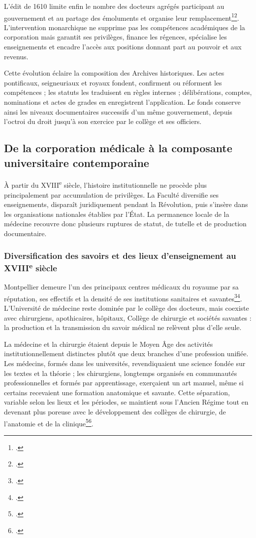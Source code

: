 L'édit de 1610 limite enfin le nombre des docteurs agrégés participant au gouvernement et au partage des émoluments et organise leur remplacement\footcite[fol.~160v--164v]{AHFMS1}\footcite[p. 126--141]{Astruc1767}. L'intervention monarchique ne supprime pas les compétences académiques de la corporation mais garantit ses privilèges, finance les régences, spécialise les enseignements et encadre l'accès aux positions donnant part au pouvoir et aux revenus.

Cette évolution éclaire la composition des Archives historiques. Les actes pontificaux, seigneuriaux et royaux fondent, confirment ou réforment les compétences ; les statuts les traduisent en règles internes ; délibérations, comptes, nominations et actes de grades en enregistrent l'application. Le fonds conserve ainsi les niveaux documentaires successifs d'un même gouvernement, depuis l'octroi du droit jusqu'à son exercice par le collège et ses officiers.

\subsection{De la corporation médicale à la composante universitaire contemporaine}

À partir du XVIII\textsuperscript{e} siècle, l'histoire institutionnelle ne procède plus principalement par accumulation de privilèges. La Faculté diversifie ses enseignements, disparaît juridiquement pendant la Révolution, puis s'insère dans les organisations nationales établies par l'État. La permanence locale de la médecine recouvre donc plusieurs ruptures de statut, de tutelle et de production documentaire.

\subsubsection{Diversification des savoirs et des lieux d'enseignement au XVIII\textsuperscript{e} siècle}

Montpellier demeure l'un des principaux centres médicaux du royaume par sa réputation, ses effectifs et la densité de ses institutions sanitaires et savantes\footcite{Lacour2026GensSante}\footcite{Dulieu1958MouvementScientifique}. L'Université de médecine reste dominée par le collège des docteurs, mais coexiste avec chirurgiens, apothicaires, hôpitaux, Collège de chirurgie et sociétés savantes : la production et la transmission du savoir médical ne relèvent plus d'elle seule.

La médecine et la chirurgie étaient depuis le Moyen Âge des activités institutionnellement distinctes plutôt que deux branches d'une profession unifiée. Les médecins, formés dans les universités, revendiquaient une science fondée sur les textes et la théorie ; les chirurgiens, longtemps organisés en communautés professionnelles et formés par apprentissage, exerçaient un art manuel, même si certains recevaient une formation anatomique et savante. Cette séparation, variable selon les lieux et les périodes, se maintient sous l'Ancien Régime tout en devenant plus poreuse avec le développement des collèges de chirurgie, de l'anatomie et de la clinique\footcite{Brockliss1989EnseignementMedical}\footcite{Brier2019OrganisationMedicale}.

